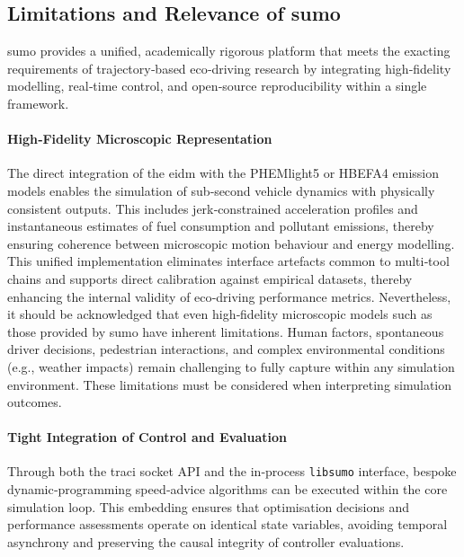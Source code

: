 \subsection{Limitations and Relevance of \ac{sumo}}
\label{subsec:sumo_limitation_relevance}

\ac{sumo} provides a unified, academically rigorous platform that meets the exacting requirements of trajectory‐based eco‐driving research by integrating high‐fidelity modelling, real‐time control, and open‐source reproducibility within a single framework.

\paragraph{High‐Fidelity Microscopic Representation}
The direct integration of the \ac{eidm} with the PHEMlight5 or HBEFA4 emission models enables the simulation of sub‐second vehicle dynamics with physically consistent outputs. This includes jerk‐constrained acceleration profiles and instantaneous estimates of fuel consumption and pollutant emissions, thereby ensuring coherence between microscopic motion behaviour and energy modelling. This unified implementation eliminates interface artefacts common to multi‐tool chains and supports direct calibration against empirical datasets, thereby enhancing the internal validity of eco‐driving performance metrics. Nevertheless, it should be acknowledged that even high‐fidelity microscopic models such as those provided by \ac{sumo} have inherent limitations. Human factors, spontaneous driver decisions, pedestrian interactions, and complex environmental conditions (e.g., weather impacts) remain challenging to fully capture within any simulation environment. These limitations must be considered when interpreting simulation outcomes.

\paragraph{Tight Integration of Control and Evaluation}
Through both the \ac{traci} socket API and the in‐process \texttt{libsumo} interface, bespoke dynamic‐programming speed‐advice algorithms can be executed within the core simulation loop. This embedding ensures that optimisation decisions and performance assessments operate on identical state variables, avoiding temporal asynchrony and preserving the causal integrity of controller evaluations.

